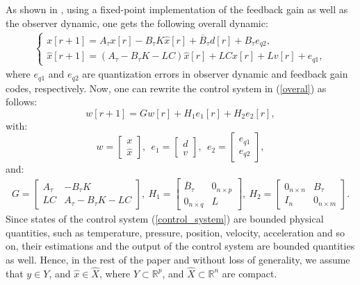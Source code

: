 \documentclass{amsart}
\numberwithin{equation}{section}
\newcommand{\R}{{\mathbb{R}}}
\begin{document}
As shown in \cite{anta}, using a fixed-point implementation of the feedback gain as well as the observer dynamic, 
one gets the following overall dynamic:
\begin{align}\label{overal}
\left\{\begin{array}{l}x[r+1]=A_\tau x[r]-B_\tau K\widehat{x}[r]+\overline{B}_\tau d[r]+B_\tau e_{q2},\\\widehat{x}[r+1]=(A_\tau-B_\tau K-LC)\widehat{x}[r]+LCx[r]+Lv[r]+e_{q1},\end{array}\right.
\end{align}
where $e_{q1}$ and $e_{q2}$ are quantization errors in observer dynamic and feedback gain codes, respectively. 
Now, one can rewrite the control system in (\ref{overal}) as follows:
\begin{equation}\label{overal1}
w[r+1]=Gw[r]+H_1e_1[r]+H_2e_2[r],
\end{equation}
with: 
\begin{equation}\nonumber
w=\left[\begin{array}{l}x\\\widehat{x}\end{array}\right],~~e_1=\left[\begin{array}{l}d\\v\end{array}\right],~~e_2=\left[\begin{array}{l}e_{q1}\\e_{q2}\end{array}\right],
\end{equation}
and:
\begin{align}\nonumber
G=\left[\begin{array}{cc}A_\tau&-B_\tau{K}\\LC&A_\tau-B_\tau{K}-LC\end{array}\right],~H_1=\left[\begin{array}{cc}\overline{B}_\tau&0_{n\times{p}}\\0_{n\times{q}}&L\end{array}\right],~H_2=\left[\begin{array}{cc}0_{n\times{n}}&B_\tau\\I_{n}&0_{n\times{m}}\end{array}\right].
\end{align}
Since states of the control system (\ref{control_system}) are bounded physical quantities, such as 
temperature, pressure, position, velocity, acceleration and so on, their estimations and the output of the control system are bounded quantities as well. Hence, in the rest of the paper and without loss of generality, we assume that $y\in{Y}$, and $\widehat{x}\in\widehat{X}$, where $Y\subset\R^p$, and $\widehat{X}\subset\R^n$ are compact.
\end{document}
